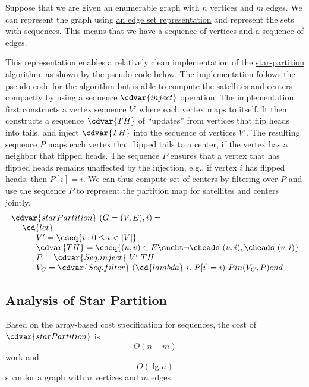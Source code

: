 \begin{gram}[Implementation]
Suppose that we are given an enumerable graph with $n$ vertices and $m$ edges. 
%
We can represent the graph using 
%
\href{sec:graphs:graphs::edgesets}{an edge set representation}
%
and represent the sets with sequences.
%
This means that we have a sequence of vertices and a sequence of edges.
%

This representation enables a relatively clean implementation of the
%
\href{alg:graphcon::star-partition}{star-partition algorithm},
%
as shown by the pseudo-code below.
%
The implementation follows the pseudo-code for the algorithm but is able to compute the satellites and centers compactly by using a sequence $\cdvar{inject}$ operation.
%
The implementation first constructs a vertex sequence $V'$ where each vertex maps to itself.
%
It then constructs a sequence 
%
$\cdvar{TH}$ 
%
of ``updates'' from vertices that flip heads into tails,
%
and inject $\cdvar{TH}$ into the sequence of vertices $V'$.
%
The resulting sequence $P$ maps each vertex that flipped tails to  a center, if the vertex has a neighbor that flipped heads.
%
The sequence $P$ ensures that a vertex that has flipped heads  remains unaffected by the injection, e.g., if vertex $i$ has flipped heads, then 
%
$P[i] = i$.
%
We can thus compute set of centers by filtering over $P$ and use the sequence $P$ to represent the partition map for satellites and centers jointly.
\[
\begin{array}{l}
\cdvar{starPartition}~(G = (V, E), i) =
\\
~~~~\cd{let}
\\
~~~~~~~~~V' = \cseq{i : 0 \le i < |V|}
\\
~~~~~~~~~\cdvar{TH} = \cseq{ (u,v) \in E \sucht \neg \cheads~(u, i), \cheads~(v, i) }
\\
~~~~~~~~~P = \cdvar{Seq.inject}~V'~TH
\\
~~~~~~~~~V_C = \cdvar{Seq.filter}~(\cd{lambda}~i.~P[i] = i)~P
in (V_C, P) end
\end{array}
\]
\end{gram}


\subsection{Analysis of Star Partition}
\label{sec:graphcon::star::partition::analysis}

\begin{theorem}
\label{thm:graphcon::star::partition::analysis}
Based on the array-based cost specification for sequences, the cost of $\cdvar{starPartition}$ is 
\[
O(n + m)
\]
work and 
\[
O(\lg n)
\]
span for a graph with $n$ vertices and $m$ edges.
\end{theorem}

